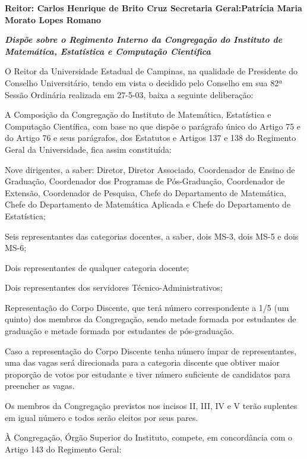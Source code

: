 \documentclass{documento}
\begin{document}
\noindent\textbf{Reitor: Carlos Henrique de Brito Cruz
Secretaria Geral:Patrícia Maria Morato Lopes Romano}

\noindent\textbf{\textit{Dispõe sobre o Regimento Interno da Congregação do Instituto de Matemática, Estatística e Computação Científica}}

\noindent O Reitor da Universidade Estadual de Campinas, na qualidade de Presidente do Conselho Universitário, tendo em vista o decidido pelo Conselho em sua 82ª Sessão Ordinária realizada em 27-5-03, baixa a seguinte deliberação:



\artigo A Composição da Congregação do Instituto de Matemática, Estatística e Computação Científica, com base no que dispõe o parágrafo único do Artigo 75 e do Artigo 76 e seus parágrafos, dos Estatutos e Artigos 137 e 138 do Regimento Geral da Universidade, fica assim constituída:

\inciso Nove dirigentes, a saber: Diretor, Diretor Associado, Coordenador de Ensino de Graduação, Coordenador dos Programas de Pós-Graduação, Coordenador de Extensão, Coordenador de Pesquisa, Chefe do Departamento de Matemática, Chefe do Departamento de Matemática Aplicada e Chefe do Departamento de Estatística;

\inciso Seis representantes das categorias docentes, a saber, dois MS-3, dois MS-5 e dois MS-6;

\inciso Dois representantes de qualquer categoria docente;

\inciso Dois representantes dos servidores Técnico-Administrativos;

\inciso Representação do Corpo Discente, que terá número correspondente a 1/5 (um quinto) dos membros da Congregação, sendo metade formada por estudantes de graduação e metade formada por estudantes de pós-graduação.

\paragrafo Caso a representação do Corpo Discente tenha número ímpar de representantes, uma das vagas será direcionada para a categoria discente que obtiver maior proporção de votos por estudante e tiver número suficiente de candidatos para preencher as vagas.

\paragrafo Os membros da Congregação previstos nos incisos II, III, IV e V terão suplentes em igual número e todos serão eleitos por seus pares.


\artigo À Congregação, Órgão Superior do Instituto, compete, em concordância com o Artigo 143 do Regimento Geral: 
\end{document}
